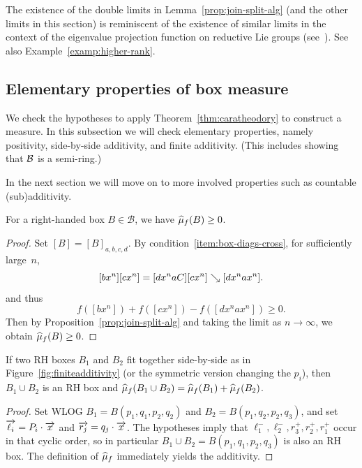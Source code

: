 \begin{remark} 
 The existence of the double limits in Lemma~\ref{prop:join-split-alg} (and the other limits in this section) is reminiscent of the existence of
 similar limits in the context of the eigenvalue projection function
 on reductive Lie groups (see~\cite[Lemma~7.10]{BQ16:Random}).
 See also Example~\ref{examp:higher-rank}.
 \end{remark}
 
\subsection{Elementary properties of box measure}

We check the hypotheses to apply
Theorem~\ref{thm:caratheodory} to construct a measure. In this
subsection we will check elementary properties, namely positivity,
side-by-side additivity, and finite additivity. (This includes showing
that $\mathcal{B}$ is a semi-ring.)

In the next section we
will move on to more involved properties such as countable
(sub)additivity.

\begin{proposition}
  \label{prop:box-positive}
  For a right-handed box $B\in \mathcal{B}$, we have $\widehat{\mu}_f(B) \geq 0$.
\end{proposition}

\begin{proof}
  Set $[B] = [B]_{a,b,c,d}$. By condition~\ref{item:box-diags-cross}, for sufficiently large~$n$,
  \[
    [bx^n][cx^n] = [dx^naC][cx^n] \mathrel{\searrow} [dx^nax^n].
  \]
  and thus
\[
f([bx^n]) + f([cx^n]) -f([dx^nax^n]) \geq 0.
\]
  Then by Proposition~\ref{prop:join-split-alg} and taking the limit as $n \to \infty$, we obtain $\widehat{\mu}_f(B) \geq 0$.
\end{proof}

\begin{proposition}
  \label{prop:sidebyside}
  If two RH boxes $B_1$ and $B_2$ fit together side-by-side as in Figure~\ref{fig:finiteadditivity} (or the symmetric version changing the $p_i$), then $B_1 \cup B_2$ is an RH box and $\widehat{\mu}_f(B_1 \cup B_2) = \widehat{\mu}_f(B_1) + \widehat{\mu}_f(B_2)$.
\end{proposition}

\begin{proof}
  Set WLOG $B_1 =  B(p_1,q_1,p_2,q_2)$ and $B_2 = B(p_1,q_2,p_2,q_3)$, and set $\overrightarrow{\ell_i} = P_i \cdot \overrightarrow{x}$ and $\overrightarrow{r_j} = q_j \cdot \overrightarrow{x}$. The hypotheses imply that $\ell_1^-,\ell_2^-,r_3^+, r_2^+, r_1^+$ occur in that cyclic order, so in particular $B_1 \cup B_2 = B(p_1,q_1,p_2,q_3)$ is also an RH box. The definition of $\widehat{\mu}_f$ immediately yields the additivity.
\end{proof}

